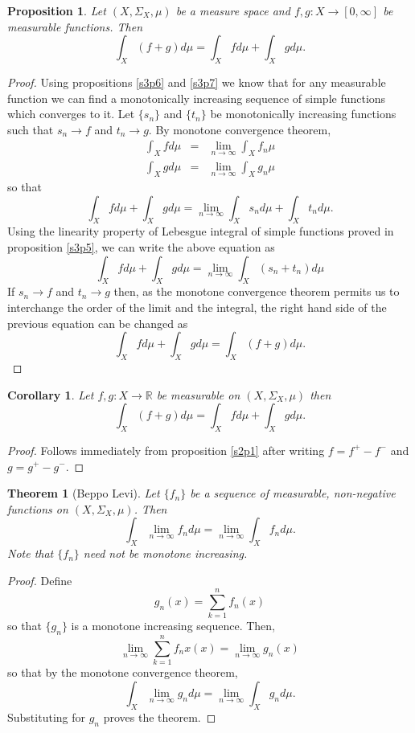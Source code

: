 \documentclass{article}
\newcommand{\sor}{\mathbb{R}}
\theoremstyle{plain}
\newtheorem{thm}{Theorem}
\numberwithin{thm}{section}
\theoremstyle{plain}
\newtheorem{prop}{Proposition}
\numberwithin{prop}{section}
\theoremstyle{definition}
\numberwithin{defn}{section}
\theoremstyle{remark}
\theoremstyle{plain}
\newtheorem{cor}{Corollary}
\numberwithin{cor}{section}
\numberwithin{equation}{section}
\begin{document}
\begin{prop}\label{s4p2}
Let $(X, \Sigma_X, \mu)$ be a measure space and $f, g: X \rightarrow [0, \infty]$
be measurable functions. Then
\[
\int_X(f + g)d\mu = \int_X f d\mu + \int_X g d\mu.
\]
\end{prop}
\begin{proof}
Using propositions \ref{s3p6} and \ref{s3p7} we know that for any measurable
function we can find a monotonically increasing sequence of simple functions
which converges to it. Let $\{s_n\}$ and $\{t_n\}$ be monotonically increasing
functions such that $s_n \rightarrow f$ and $t_n \rightarrow g$. By monotone
convergence theorem,
\begin{eqnarray*}
\int_X f d\mu &=& \lim_{n \rightarrow \infty} \int_X f_n \mu \\
\int_X g d\mu &=& \lim_{n \rightarrow \infty} \int_X g_n \mu
\end{eqnarray*}
so that
\[
\int_X fd\mu + \int_X gd\mu = \lim_{n \rightarrow \infty} \int_X s_n d\mu +
\int_X t_n d\mu.
\]
Using the linearity property of Lebesgue integral of simple functions proved in
proposition \ref{s3p5}, we can write the above equation as
\[
\int_X fd\mu + \int_X gd\mu = \lim_{n \rightarrow \infty} \int_X (s_n + t_n) d\mu
\]
If $s_n \rightarrow f$ and $t_n \rightarrow g$ then, as the monotone convergence
theorem permits us to interchange the order of the limit and the integral, the
right hand side of the previous equation can be changed as
\[
\int_X fd\mu + \int_X gd\mu = \int_X (f + g)d\mu.
\]
\end{proof}

\begin{cor}\label{s4c1}
Let $f, g: X \rightarrow \sor$ be measurable on $(X, \Sigma_X, \mu)$ then
\[
\int_X(f + g)d\mu = \int_X f d\mu + \int_X g d\mu.
\]
\end{cor}
\begin{proof}
Follows immediately from proposition \ref{s2p1} after writing $f = f^+ - f^-$
and $g = g^+ - g^-$.
\end{proof}

\begin{thm}[Beppo Levi]\label{s4t3}
Let $\{f_n\}$ be a sequence of measurable, non-negative functions on $(X, 
\Sigma_X, \mu)$. Then
\[
\int_X \lim_{n \rightarrow \infty}f_n d\mu = 
\lim_{n \rightarrow \infty}\int_X f_n d\mu.
\]
Note that $\{f_n\}$ need not be monotone increasing.
\end{thm}
\begin{proof}
Define 
\[
g_n(x) = \sum_{k=1}^n f_n(x)
\]
so that $\{g_n\}$ is a monotone increasing sequence. Then,
\[
\lim_{n \rightarrow \infty}\sum_{k=1}^n f_nx(x) = \lim_{n \rightarrow \infty}g_n(x)
\]
so that by the monotone convergence theorem,
\[
\int_X \lim_{n \rightarrow \infty} g_n d\mu = \lim_{n \rightarrow \infty}\int_X
g_n d\mu.
\]
Substituting for $g_n$ proves the theorem.
\end{proof}
\end{document}
